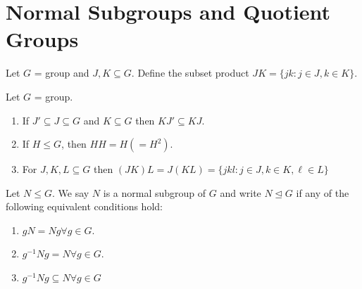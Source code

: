\section{Normal Subgroups and Quotient Groups}

Let \(G\) = group and \(J, K \subseteq G\). Define the subset product
\(JK = \{jk : j \in J, k \in K\}\).

\begin{proposition}
    Let \(G\) = group.
    \begin{enumerate}
        \item If \(J' \subseteq J \subseteq G\) and \(K \subseteq G\) then \(KJ' \subseteq KJ\).
        \item If \(H \leq G\), then \(HH = H (=H^2)\).
        \item For \(J, K, L \subseteq G\) then \((JK)L = J(KL) = \{ jkl: j \in J, k \in K, \ell \in L\}\)
    \end{enumerate}
\end{proposition}

\begin{prop-defn}
Let \(N \leq G\). We say \(N\) is a normal subgroup of \(G\) and write \(N \trianglelefteq G\) if any of the following equivalent conditions hold:
\begin{enumerate}
    \item \(gN = Ng \forall g \in G\).
    \item \(g^{-1}Ng = N \forall g \in G\).
    \item \(g^{-1}Ng \subseteq N \forall g \in G\)
\end{enumerate}
\end{prop-defn}

